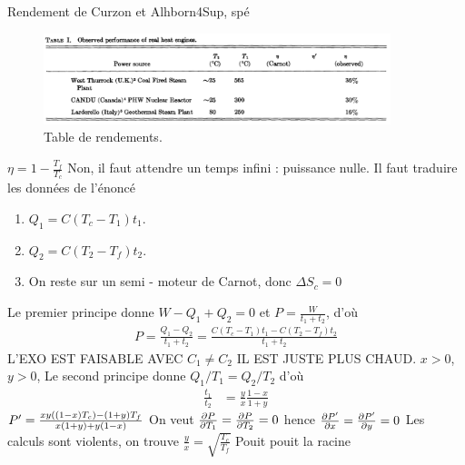 \begin{exercise}{Rendement de Curzon et Alhborn}{4}{Sup, spé}
\begin{figure}[H]
    \centering
    \includegraphics[width=0.9\textwidth]{thermo/machinesthermiques/RendementsCA.png}
    \caption{Table de rendements.}
\end{figure}

\end{exercise}

\begin{solution}
\begin{questions}
    \questioncours $\eta = 1 -\frac{T_f}{T_c}$
    \question Non, il faut attendre un temps infini : puissance nulle.
    \question Il faut traduire les données de l'énoncé
    \begin{enumerate}
        \item $Q_1 = C(T_c-T_1) t_1$.
        \item $Q_2 = C(T_2-T_f) t_2$.
        \item On reste sur un semi - moteur de Carnot, donc $\Delta S_{c} = 0$
    \end{enumerate}
    Le premier principe donne $W - Q_1 + Q_2 = 0$ et $P = \frac{W}{t_1+t_2}$, d'où
    \begin{align*}
        P = \frac{Q_1 - Q_2}{t_1+t_2} = \frac{C(T_c-T_1) t_1 - C(T_2-T_f) t_2}{t_1+t_2}
    \end{align*}
    L'EXO EST FAISABLE AVEC $C_1 \neq C_2$ IL EST JUSTE PLUS CHAUD.
    \question $x > 0$, $y > 0$, Le second principe donne $Q_1/T_1 = Q_2/T_2$ d'où 
    \begin{align*}
        \frac{t_1}{t_2} &= \frac{y}{x}\frac{1-x}{1+y}
    \end{align*}
    \question $P' = \frac{ xy\qty( (1-x)T_c ) - (1+y)T_f }{ x(1+y) + y(1-x) }$
    \question On veut $\pdv{P}{T_1} = \pdv{P}{T_2} = 0$ hence $\pdv{P'}{x} = \pdv{P'}{y} = 0$
    \question Les calculs sont violents, on trouve $\frac{y}{x} = \sqrt{\frac{T_c}{T_f}}$
    \question Pouit pouit la racine
\end{questions}
\end{solution}